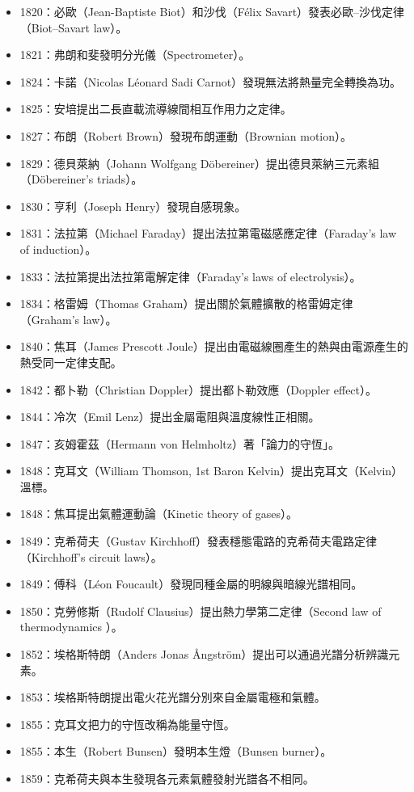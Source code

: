 \documentclass[a4paper,12pt]{article}
\begin{document}
\begin{itemize}
\item 1820：必歐（Jean-Baptiste Biot）和沙伐（Félix Savart）發表必歐–沙伐定律（Biot–Savart law）。
\item 1821：弗朗和斐發明分光儀（Spectrometer）。
\item 1824：卡諾（Nicolas Léonard Sadi Carnot）發現無法將熱量完全轉換為功。
\item 1825：安培提出二長直載流導線間相互作用力之定律。
\item 1827：布朗（Robert Brown）發現布朗運動（Brownian motion）。
\item 1829：德貝萊納（Johann Wolfgang Döbereiner）提出德貝萊納三元素組（Döbereiner's triads）。
\item 1830：亨利（Joseph Henry）發現自感現象。
\item 1831：法拉第（Michael Faraday）提出法拉第電磁感應定律（Faraday's law of induction）。
\item 1833：法拉第提出法拉第電解定律（Faraday's laws of electrolysis）。
\item 1834：格雷姆（Thomas Graham）提出關於氣體擴散的格雷姆定律（Graham's law）。
\item 1840：焦耳（James Prescott Joule）提出由電磁線圈產生的熱與由電源產生的熱受同一定律支配。
\item 1842：都卜勒（Christian Doppler）提出都卜勒效應（Doppler effect）。
\item 1844：冷次（Emil Lenz）提出金屬電阻與溫度線性正相關。
\item 1847：亥姆霍茲（Hermann von Helmholtz）著「論力的守恆」。
\item 1848：克耳文（William Thomson, 1st Baron Kelvin）提出克耳文（Kelvin）溫標。
\item 1848：焦耳提出氣體運動論（Kinetic theory of gases）。
\item 1849：克希荷夫（Gustav Kirchhoff）發表穩態電路的克希荷夫電路定律（Kirchhoff's circuit laws）。
\item 1849：傅科（Léon Foucault）發現同種金屬的明線與暗線光譜相同。
\item 1850：克勞修斯（Rudolf Clausius）提出熱力學第二定律（Second law of thermodynamics
）。
\item 1852：埃格斯特朗（Anders Jonas Ångström）提出可以通過光譜分析辨識元素。
\item 1853：埃格斯特朗提出電火花光譜分別來自金屬電極和氣體。
\item 1855：克耳文把力的守恆改稱為能量守恆。
\item 1855：本生（Robert Bunsen）發明本生燈（Bunsen burner）。
\item 1859：克希荷夫與本生發現各元素氣體發射光譜各不相同。

\end{itemize}
\end{document}
